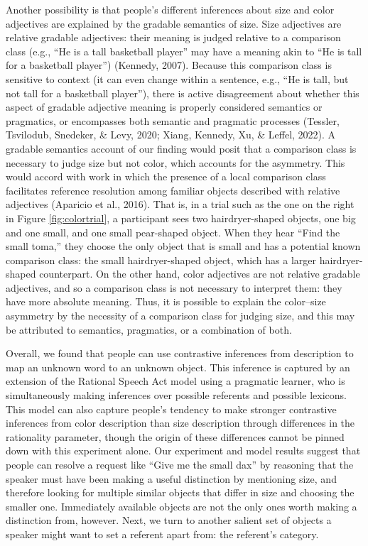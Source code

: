\documentclass[
  english,
  man,floatsintext]{apa6}
\begin{document}
Another possibility is that people's different inferences about size and color adjectives are explained by the gradable semantics of size. Size adjectives are relative gradable adjectives: their meaning is judged relative to a comparison class (e.g., ``He is a tall basketball player'' may have a meaning akin to ``He is tall for a basketball player'') (Kennedy, 2007). Because this comparison class is sensitive to context (it can even change within a sentence, e.g., ``He is tall, but not tall for a basketball player''), there is active disagreement about whether this aspect of gradable adjective meaning is properly considered semantics or pragmatics, or encompasses both semantic and pragmatic processes (Tessler, Tsvilodub, Snedeker, \& Levy, 2020; Xiang, Kennedy, Xu, \& Leffel, 2022). A gradable semantics account of our finding would posit that a comparison class is necessary to judge size but not color, which accounts for the asymmetry. This would accord with work in which the presence of a local comparison class facilitates reference resolution among familiar objects described with relative adjectives (Aparicio et al., 2016). That is, in a trial such as the one on the right in Figure \ref{fig:colortrial}, a participant sees two hairdryer-shaped objects, one big and one small, and one small pear-shaped object. When they hear ``Find the small toma,'' they choose the only object that is small and has a potential known comparison class: the small hairdryer-shaped object, which has a larger hairdryer-shaped counterpart. On the other hand, color adjectives are not relative gradable adjectives, and so a comparison class is not necessary to interpret them: they have more absolute meaning. Thus, it is possible to explain the color--size asymmetry by the necessity of a comparison class for judging size, and this may be attributed to semantics, pragmatics, or a combination of both.

Overall, we found that people can use contrastive inferences from description to map an unknown word to an unknown object. This inference is captured by an extension of the Rational Speech Act model using a pragmatic learner, who is simultaneously making inferences over possible referents and possible lexicons. This model can also capture people's tendency to make stronger contrastive inferences from color description than size description through differences in the rationality parameter, though the origin of these differences cannot be pinned down with this experiment alone. Our experiment and model results suggest that people can resolve a request like ``Give me the small dax'' by reasoning that the speaker must have been making a useful distinction by mentioning size, and therefore looking for multiple similar objects that differ in size and choosing the smaller one. Immediately available objects are not the only ones worth making a distinction from, however. Next, we turn to another salient set of objects a speaker might want to set a referent apart from: the referent's category.
\end{document}

